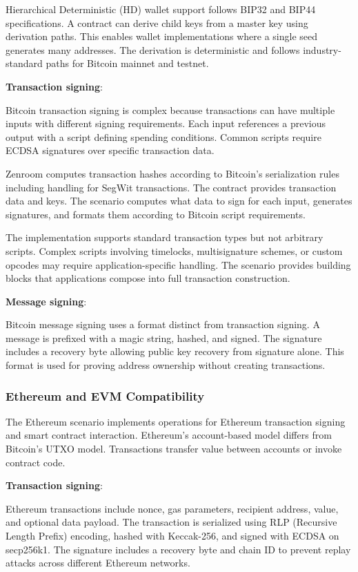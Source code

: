 Hierarchical Deterministic (HD) wallet support follows BIP32 and BIP44
specifications. A contract can derive child keys from a master key
using derivation paths. This enables wallet implementations where a
single seed generates many addresses. The derivation is deterministic
and follows industry-standard paths for Bitcoin mainnet and testnet.

\textbf{Transaction signing}:

Bitcoin transaction signing is complex because transactions can have
multiple inputs with different signing requirements. Each input
references a previous output with a script defining spending
conditions. Common scripts require ECDSA signatures over specific
transaction data.

Zenroom computes transaction hashes according to Bitcoin's
serialization rules including handling for SegWit transactions. The
contract provides transaction data and keys. The scenario computes
what data to sign for each input, generates signatures, and formats
them according to Bitcoin script requirements.

The implementation supports standard transaction types but not
arbitrary scripts. Complex scripts involving timelocks, multisignature
schemes, or custom opcodes may require application-specific
handling. The scenario provides building blocks that applications
compose into full transaction construction.

\textbf{Message signing}:

Bitcoin message signing uses a format distinct from transaction
signing. A message is prefixed with a magic string, hashed, and
signed. The signature includes a recovery byte allowing public key
recovery from signature alone. This format is used for proving address
ownership without creating transactions.

\subsubsection{Ethereum and EVM Compatibility}

The Ethereum scenario implements operations for Ethereum transaction
signing and smart contract interaction. Ethereum's account-based model
differs from Bitcoin's UTXO model. Transactions transfer value between
accounts or invoke contract code.

\textbf{Transaction signing}:

Ethereum transactions include nonce, gas parameters, recipient
address, value, and optional data payload. The transaction is
serialized using RLP (Recursive Length Prefix) encoding, hashed with
Keccak-256, and signed with ECDSA on secp256k1. The signature includes
a recovery byte and chain ID to prevent replay attacks across
different Ethereum networks.

